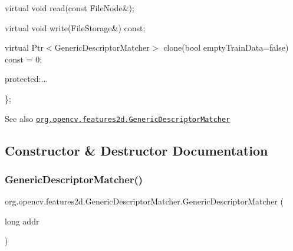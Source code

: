 {\ttfamily virtual void read(const File\+Node\&);}

{\ttfamily }

{\ttfamily }

{\ttfamily virtual void write(\+File\+Storage\&) const;}

{\ttfamily }

{\ttfamily }

{\ttfamily virtual Ptr$<$\+Generic\+Descriptor\+Matcher$>$ clone(bool empty\+Train\+Data=false) const = 0;}

{\ttfamily }

{\ttfamily }

{\ttfamily protected\+:...}

{\ttfamily }

{\ttfamily }

{\ttfamily \};}

{\ttfamily }

{\ttfamily \begin{DoxySeeAlso}{See also}
\href{http://docs.opencv.org/modules/features2d/doc/common_interfaces_of_generic_descriptor_matchers.html#genericdescriptormatcher}{\tt org.\+opencv.\+features2d.\+Generic\+Descriptor\+Matcher} 
\end{DoxySeeAlso}
}

\subsection{Constructor \& Destructor Documentation}
\mbox{\label{classorg_1_1opencv_1_1features2d_1_1_generic_descriptor_matcher_a0a76a002983674ac66ea7419b901231c}} 
\subsubsection{\texorpdfstring{Generic\+Descriptor\+Matcher()}{GenericDescriptorMatcher()}}
{\footnotesize\ttfamily org.\+opencv.\+features2d.\+Generic\+Descriptor\+Matcher.\+Generic\+Descriptor\+Matcher (\begin{DoxyParamCaption}\item[{long}]{addr }\end{DoxyParamCaption})\hspace{0.3cm}{\ttfamily [protected]}}




